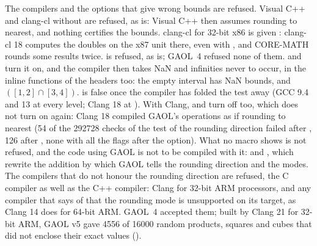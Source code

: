 \documentclass[12pt,a4paper,twoside,openright]{book}
\begin{document}
\medskip
The compilers and the options that give wrong bounds are
refused.\newinvfive{} Visual C++ and clang-cl without 
are refused, as  is: Visual C++ then assumes rounding to
nearest, and nothing certifies the bounds. clang-cl for 32-bit x86 is given
: clang-cl 18 computes the doubles on the x87 unit there,
even with , and CORE-MATH rounds some results twice.
 is refused, as  is; GAOL~4
refused none of them.  and  turn it on,
and the compiler then takes NaN and infinities never to occur, in the inline
functions of the headers too: the empty interval has NaN bounds, and
$([1, 2] \cap [3, 4])$. is false once the compiler has
folded the test away (GCC 9.4 and 13 at every level; Clang 18 at
). With Clang,  and  turn
 off too, which  does not turn
on again: Clang 18 compiled GAOL's operations as if rounding to nearest (54
of the 292728 checks of the test of the rounding direction failed after
, 126 after , none with all the flags after the option). What no macro
shows is not refused, and the code using GAOL is not to be compiled with it:
 and , which
rewrite the addition by which GAOL tells the rounding direction and the
modes. The compilers that do not honour the rounding direction are refused,
the C compiler as well as the C++ compiler: Clang for 32-bit ARM processors,
and any compiler that says of  that the rounding
mode is unsupported on its target, as Clang 14 does for 64-bit ARM. GAOL~4
accepted them; built by Clang 21 for 32-bit ARM, GAOL v5 gave 4556 of 16000
random products, squares and cubes that did not enclose their exact values
().
\end{document}
